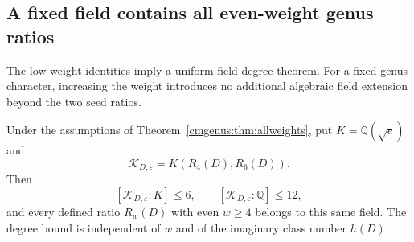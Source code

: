 
\subsection{A fixed field contains all even-weight genus ratios}

The low-weight identities imply a uniform field-degree theorem.
For a fixed genus character, increasing the weight introduces no
additional algebraic field extension beyond the two seed ratios.

\begin{theorem}
\label{cmgenus:thm:degree}
Under the assumptions of Theorem~\ref{cmgenus:thm:allweights}, put
$K=\mathbb Q(\sqrt e)$ and
\[
 \mathcal K_{D,\varepsilon}=K(R_4(D),R_6(D)).
\]
Then
\[
 [\mathcal K_{D,\varepsilon}:K]\leq6,
 \qquad [\mathcal K_{D,\varepsilon}:\mathbb Q]\leq12,
\]
and every defined ratio $R_w(D)$ with even $w\geq4$ belongs to this
same field. The degree bound is independent of $w$ and of the imaginary
class number $h(D)$.
\end{theorem}


